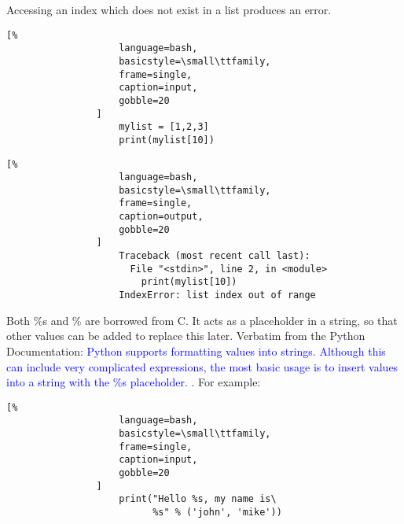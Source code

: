 \documentclass[crop=false,class=article,oneside]{standalone}
\begin{document}
            Accessing an index which does not exist in a
            list produces an error.\newline
            \begin{minipage}[t]{.48\textwidth}
                \centering
                \begin{lstlisting}[%
                    language=bash,
                    basicstyle=\small\ttfamily,
                    frame=single,
                    caption=input,
                    gobble=20
                ]
                    mylist = [1,2,3]
                    print(mylist[10])
                \end{lstlisting}
            \end{minipage}\hfill
            \begin{minipage}[t]{.48\textwidth}
                \centering
                \begin{lstlisting}[%
                    language=bash,
                    basicstyle=\small\ttfamily,
                    frame=single,
                    caption=output,
                    gobble=20
                ]
                    Traceback (most recent call last):
                      File "<stdin>", line 2, in <module>
                        print(mylist[10])
                    IndexError: list index out of range
                \end{lstlisting}
            \end{minipage}
            Both \%s and \% are borrowed from C. It acts as a
            placeholder in a string, so that other values can be
            added to replace this later. Verbatim from the Python
            Documentation:\newline
            \textcolor{blue}{%
                Python supports formatting values into strings.
                Although this can include very complicated
                expressions, the most basic usage is to insert
                values into a string with the \%s placeholder.
            }.\newline
            For example:\newline
            \begin{minipage}[t]{.48\textwidth}
                \centering
                \begin{lstlisting}[%
                    language=bash,
                    basicstyle=\small\ttfamily,
                    frame=single,
                    caption=input,
                    gobble=20
                ]
                    print("Hello %s, my name is\
                          %s" % ('john', 'mike'))
                \end{lstlisting}
            \end{minipage}\hfill
\end{document}
